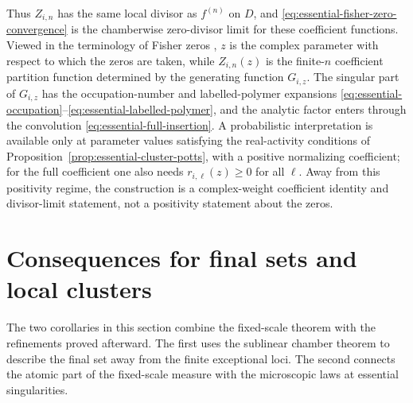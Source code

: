 \documentclass[reqno]{article}
\theoremstyle{definition}
\theoremstyle{remark}
\theoremstyle{plain}
\begin{document}
Thus \(Z_{i,n}\) has the same local divisor as \(f^{(n)}\) on \(D\), and \eqref{eq:essential-fisher-zero-convergence} is the chamberwise zero-divisor limit for these coefficient functions. Viewed in the terminology of Fisher zeros \cite{Fisher1965}, \(z\) is the complex parameter with respect to which the zeros are taken, while \(Z_{i,n}(z)\) is the finite-\(n\) coefficient partition function determined by the generating function \(G_{i,z}\). The singular part of \(G_{i,z}\) has the occupation-number and labelled-polymer expansions \eqref{eq:essential-occupation}--\eqref{eq:essential-labelled-polymer}, and the analytic factor enters through the convolution \eqref{eq:essential-full-insertion}. A probabilistic interpretation is available only at parameter values satisfying the real-activity conditions of Proposition~\ref{prop:essential-cluster-potts}, with a positive normalizing coefficient; for the full coefficient one also needs \(r_{i,\ell}(z)\ge0\) for all \(\ell\). Away from this positivity regime, the construction is a complex-weight coefficient identity and divisor-limit statement, not a positivity statement about the zeros.

\section{Consequences for final sets and local clusters}\label{sec:consequences}

The two corollaries in this section combine the fixed-scale theorem with the refinements proved afterward. The first uses the sublinear chamber theorem to describe the final set away from the finite exceptional loci. The second connects the atomic part of the fixed-scale measure with the microscopic laws at essential singularities.
\end{document}
